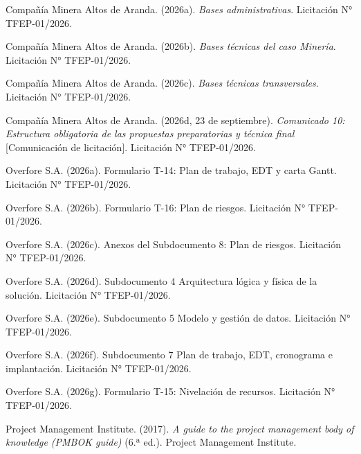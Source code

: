 \documentclass[anexo]{../../comun/overfore}
\begin{document}
\begin{horizontal}
\begin{referencias}
\item Compañía Minera Altos de Aranda. (2026a). \emph{Bases administrativas}. Licitación N° TFEP-01/2026.
\item Compañía Minera Altos de Aranda. (2026b). \emph{Bases técnicas del caso Minería}. Licitación N° TFEP-01/2026.
\item Compañía Minera Altos de Aranda. (2026c). \emph{Bases técnicas transversales}. Licitación N° TFEP-01/2026.
\item Compañía Minera Altos de Aranda. (2026d, 23 de septiembre). \emph{Comunicado 10: Estructura obligatoria de las propuestas preparatorias y técnica final} [Comunicación de licitación]. Licitación N° TFEP-01/2026.
\item Overfore S.A. (2026a). Formulario T-14: Plan de trabajo, EDT y carta Gantt. Licitación N° TFEP-01/2026.
\item Overfore S.A. (2026b). Formulario T-16: Plan de riesgos. Licitación N° TFEP-01/2026.
\item Overfore S.A. (2026c). Anexos del Subdocumento 8: Plan de riesgos. Licitación N° TFEP-01/2026.
\item Overfore S.A. (2026d). Subdocumento 4 Arquitectura lógica y física de la solución. Licitación N° TFEP-01/2026.
\item Overfore S.A. (2026e). Subdocumento 5 Modelo y gestión de datos. Licitación N° TFEP-01/2026.
\item Overfore S.A. (2026f). Subdocumento 7 Plan de trabajo, EDT, cronograma e implantación. Licitación N° TFEP-01/2026.
\item Overfore S.A. (2026g). Formulario T-15: Nivelación de recursos. Licitación N° TFEP-01/2026.
\item Project Management Institute. (2017). \emph{A guide to the project management body of knowledge (PMBOK guide)} (6.ª ed.). Project Management Institute.
\end{referencias}
\end{horizontal}
\end{document}
